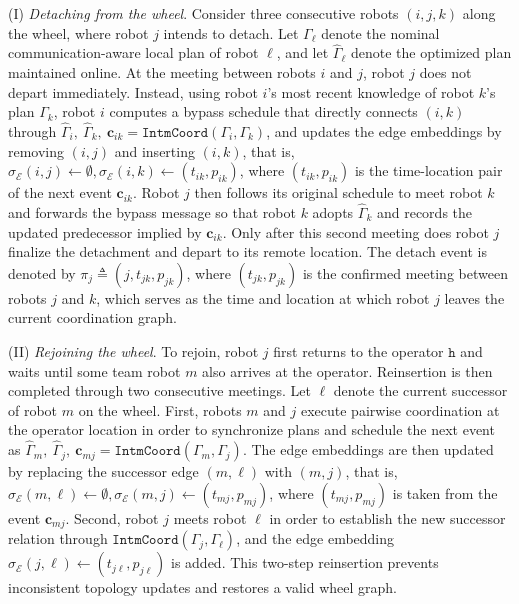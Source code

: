(I) \emph{Detaching from the wheel}.
Consider three consecutive robots $(i,j,k)$ along the wheel, where robot $j$
intends to detach. Let $\Gamma_{\ell}$ denote the nominal communication-aware local plan of robot
$\ell$, and let $\widehat{\Gamma}_{\ell}$ denote the optimized plan maintained
online. At the meeting between robots $i$ and $j$, robot $j$ does not depart
immediately. Instead, using robot $i$'s most recent knowledge of robot $k$'s
plan $\Gamma_k$, robot $i$ computes a bypass schedule that directly connects
$(i,k)$ through
$\widehat{\Gamma}_i,\ \widehat{\Gamma}_k,\ \mathbf{c}_{ik}
= \texttt{IntmCoord}(\Gamma_i,\Gamma_k)$,
and updates the edge embeddings by removing $(i,j)$ and inserting $(i,k)$, that
is,
$\sigma_{\mathcal{E}}(i,j) \leftarrow \emptyset,
\sigma_{\mathcal{E}}(i,k) \leftarrow (t_{ik}, p_{ik})$,
where $(t_{ik}, p_{ik})$ is the time-location pair of the next event
$\mathbf{c}_{ik}$. Robot $j$ then follows its original schedule to meet robot
$k$ and forwards the bypass message so that robot $k$ adopts
$\widehat{\Gamma}_k$ and records the updated predecessor implied by
$\mathbf{c}_{ik}$. Only after this second meeting does robot $j$ finalize the
detachment and depart to its remote location. The detach event is denoted by
$\pi_j \triangleq (j, t_{jk}, p_{jk})$, where $(t_{jk}, p_{jk})$ is the
confirmed meeting between robots $j$ and $k$, which serves as the time and
location at which robot $j$ leaves the current coordination graph.

(II) \emph{Rejoining the wheel}.
To rejoin, robot $j$ first returns to the operator $\texttt{h}$ and waits until
some team robot $m$ also arrives at the operator. Reinsertion is then completed
through two consecutive meetings. Let $\ell$ denote the current successor of
robot $m$ on the wheel. First, robots $m$ and $j$ execute pairwise coordination
at the operator location in order to synchronize plans and schedule the next
event as
$\widehat{\Gamma}_m,\ \widehat{\Gamma}_j,\ \mathbf{c}_{mj}
= \texttt{IntmCoord}(\Gamma_m,\Gamma_j)$.
The edge embeddings are then updated by replacing the successor edge $(m,\ell)$
with $(m,j)$, that is,
$\sigma_{\mathcal{E}}(m,\ell) \leftarrow \emptyset,
\sigma_{\mathcal{E}}(m,j) \leftarrow (t_{mj}, p_{mj})$,
where $(t_{mj}, p_{mj})$ is taken from the event $\mathbf{c}_{mj}$. Second,
robot $j$ meets robot $\ell$ in order to establish the new successor relation
through $\texttt{IntmCoord}(\Gamma_j,\Gamma_{\ell})$, and the edge embedding
$\sigma_{\mathcal{E}}(j,\ell) \leftarrow (t_{j\ell}, p_{j\ell})$ is added.
This two-step reinsertion prevents inconsistent topology updates and restores a
valid wheel graph.

